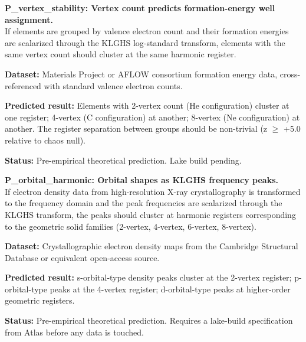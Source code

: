 \documentclass[11pt, letterpaper, openany]{book}
\begin{document}
\begin{predictionbox}
\textbf{P\_vertex\_stability: Vertex count predicts formation-energy
well assignment.}\\[0.5em]
If elements are grouped by valence electron count and their
formation energies are scalarized through the KLGHS
log-standard transform, elements with the same vertex count
should cluster at the same harmonic register.

\textbf{Dataset:} Materials Project or AFLOW consortium formation
energy data, cross-referenced with standard valence electron counts.

\textbf{Predicted result:} Elements with 2-vertex count (He
configuration) cluster at one register; 4-vertex (C configuration)
at another; 8-vertex (Ne configuration) at another. The register
separation between groups should be non-trivial (z $\geq$ +5.0
relative to chaos null).

\textbf{Status:} Pre-empirical theoretical prediction. Lake build
pending.
\end{predictionbox}

\begin{predictionbox}
\textbf{P\_orbital\_harmonic: Orbital shapes as KLGHS frequency peaks.}\\[0.5em]
If electron density data from high-resolution X-ray crystallography
is transformed to the frequency domain and the peak frequencies
are scalarized through the KLGHS transform, the peaks should
cluster at harmonic registers corresponding to the geometric solid
families (2-vertex, 4-vertex, 6-vertex, 8-vertex).

\textbf{Dataset:} Crystallographic electron density maps from
the Cambridge Structural Database or equivalent open-access source.

\textbf{Predicted result:} s-orbital-type density peaks cluster
at the 2-vertex register; p-orbital-type peaks at the 4-vertex
register; d-orbital-type peaks at higher-order geometric registers.

\textbf{Status:} Pre-empirical theoretical prediction. Requires
a lake-build specification from Atlas before any data is touched.
\end{predictionbox}
\end{document}
